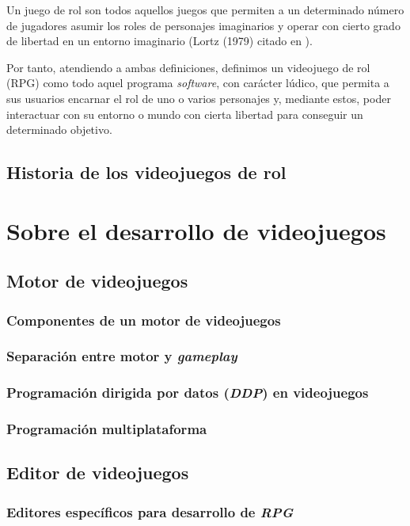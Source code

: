 \medskip

Un juego de rol son todos aquellos juegos que permiten a un determinado número de jugadores asumir los roles de personajes imaginarios y operar con cierto grado de libertad en un entorno imaginario (Lortz (1979) citado en \cite{FineRPG}).

\medskip

Por tanto, atendiendo a ambas definiciones, definimos un videojuego de rol (\acl{RPG}) como todo aquel programa \textit{software}, con carácter lúdico, que permita a sus usuarios encarnar el rol de uno o varios personajes y, mediante estos, poder interactuar con su entorno o mundo con cierta libertad para conseguir un determinado objetivo.

\subsection{Historia de los videojuegos de rol}


\section{Sobre el desarrollo de videojuegos}

\subsection{Motor de videojuegos}

\subsubsection{Componentes de un motor de videojuegos}

\subsubsection{Separación entre motor y \textit{gameplay}}

\subsubsection{Programación dirigida por datos (\textit{DDP}) en videojuegos}

\subsubsection{Programación multiplataforma}

\subsection{Editor de videojuegos}

\subsubsection{Editores específicos para desarrollo de \textit{RPG}}

